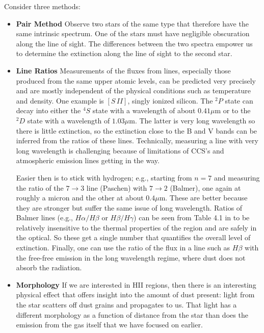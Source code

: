 \documentclass[prd,amsmath,aps,floats,amssymb, floatfix,
  superscriptaddress,nofootinbib]{revtex4-1}
\numberwithin{equation}{section}
\begin{document}
 
 Consider three methods:
 \begin{itemize}
 \item{\bf Pair Method} Observe two stars of the same type that therefore have the same intrinsic spectrum. One of the stars must have negligible obscuration along the line of sight. The differences between the two spectra empower us to determine the extinction along the line of sight to the second star.
 \item{\bf Line Ratios}
 Measurements of the fluxes from lines, especially those produced from the same upper atomic levels, can be predicted very precisely and are mostly independent of the physical conditions such as temperature and density. One example is $[S \,II]$, singly ionized silicon. The $^2P$ state can decay into either the $^4S$ state with a wavelength of about $0.41\mu$m or to the $^2D$ state with a wavelength of $1.03\mu$m. The latter is very long wavelength so there is little extinction, so the extinction close to the B and V bands can be inferred from the ratios of these lines. Technically, measuring a line with very long wavelength is challenging because of limitations of CCS's and atmospheric emission lines getting in the way.
 
 Easier then is to stick with hydrogen; e.g., starting from $n=7$ and measuring the ratio of the $7\rightarrow 3$ line (Paschen) with $7\rightarrow 2$ (Balmer), one again at roughly a micron and the other at about $0.4\mu$m. These are better because they are stronger but suffer the same issue of long wavelength. Ratios of Balmer lines (e.g., $H\alpha/H\beta$ or $H\beta/H\gamma$) can be seen from Table 4.1 in \cite{2006agna.book.....O} to be relatively insensitive to the thermal properties of the region and are safely in the optical. So these get a single number that quantifies the overall level of extinction. Finally, one can use the ratio of the flux in a line such as $H\beta$ with the free-free emission in the long wavelength regime, where dust does not absorb the radiation.
 
 \item{\bf Morphology}
 If we are interested in HII regions, then there is an interesting physical effect that offers insight into the amount of dust present: light from the star scatters off dust grains and propagates to us. That light has a different morphology as a function of distance from the star than does the emission from the gas itself that we have focused on earlier. 
 

\end{itemize}
\end{document}
